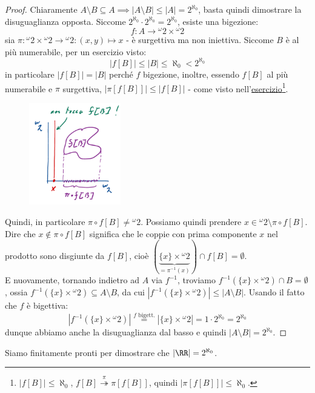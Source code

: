 \begin{proof}
	Chiaramente $A\setminus B \subseteq A \implies |A\setminus B| \leq |A| = 2^{\aleph_0}$, basta quindi dimostrare la disuguaglianza opposta.
	Siccome $2^{\aleph_0}\cdot 2^{\aleph_0} = 2^{\aleph_0}$, esiste una bigezione:
	\[ f : A \rightarrow {}^{\omega}2 \times {}^{\omega}2
		\]
	sia $\pi : {}^{\omega}2 \times {}^{\omega}2 \rightarrow {}^{\omega}2 : (x,y) \mapsto x$ - è surgettiva ma non iniettiva. Siccome $B$ è al più numerabile, per un esercizio visto:
	\[ |f[B]| \leq |B| \leq \aleph_0 < 2^{\aleph_0}
		\]
	in particolare $|f[B]| = |B|$ perché $f$ bigezione, inoltre, essendo $f[B]$ al più numerabile e $\pi$ surgettiva, $|\pi[f[B]]| \leq |f[B]|$ - come visto nell'\hyperref[disuguaglianze_senza_AC2]{esercizio}\footnote{$|f[B]| \leq \aleph_0$, $f[B] \overset{\pi}{\twoheadrightarrow} \pi[f[B]]$, quindi $|\pi[f[B]]| \leq \aleph_0$.}.
	\begin{figure}[H]
		\centering
		\includegraphics[width = 4cm]{immagini/continuo-numerabile.png}
	\end{figure}
	Quindi, in particolare $\pi \circ f[B] \ne {}^{\omega}2$. Possiamo quindi prendere $x \in {}^{\omega}2 \setminus \pi \circ f[B]$. Dire che $x \not \in \pi \circ f[B]$ significa
	che le coppie con prima componente $x$ nel prodotto sono disgiunte da $f[B]$, cioè $(\underbrace{\{x\} \times {}^{\omega}2}_{= \pi^{-1}(x)}) \cap f[B] = \emptyset$.\\
	E nuovamente, tornando indietro ad $A$ via $f^{-1}$, troviamo $f^{-1}(\{x\} \times {}^{\omega}2) \cap B = \emptyset$, ossia $f^{-1}(\{x\} \times {}^{\omega}2) \subseteq A \setminus B$,
	da cui $|f^{-1}(\{x\} \times {}^{\omega}2)| \leq |A \setminus B|$. Usando il fatto che $f$ è bigettiva:
	\[ |f^{-1}(\{x\} \times {}^{\omega}2)| \overset{\text{$f$ bigett.}}{=} |\{x\} \times {}^{\omega}2| = 1 \cdot 2^{\aleph_0} = 2^{\aleph_0}
		\]
	dunque abbiamo anche la disuguaglianza dal basso e quindi $|A \setminus B| = 2^{\aleph_0}$.
\end{proof}

Siamo finitamente pronti per dimostrare che $|\RR| = 2^{\aleph_0}$.

